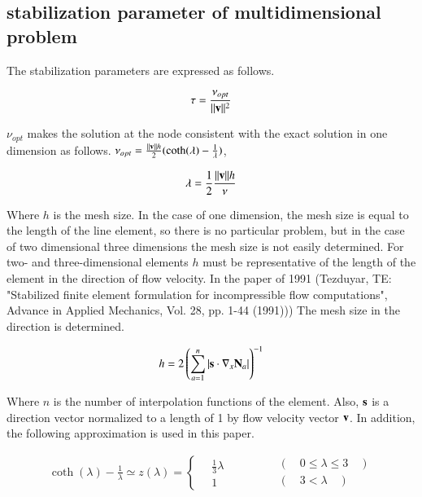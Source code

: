 \subsection{stabilization parameter of multidimensional problem}
The stabilization parameters are expressed as follows.

\begin{equation}
\tau = \frac{\nu_{opt}}{||\mathbf{v}||^2}
\end{equation}

$\nu_{opt}$ makes the solution at the node consistent with the exact solution in one dimension as follows.
$\nu_{opt} = \frac{||\mathbf{v}||h}{2}(\coth(\lambda)-\frac{1}{\lambda})$,

\begin{equation}
\lambda=\frac{1}{2}\frac{||\mathbf{v}||h}{\nu}
\end{equation}

Where $h$ is the mesh size. In the case of one dimension, the mesh size is equal to the length of the line element, so there is no particular problem, but in the case of two dimensional three dimensions the mesh size is not easily determined. For two- and three-dimensional elements $h$ must be representative of the length of the element in the direction of flow velocity.
In the paper of 1991 (Tezduyar, TE: "Stabilized finite element formulation for incompressible flow computations", Advance in Applied Mechanics, Vol. 28, pp. 1-44 (1991))) The mesh size in the direction is determined.

\begin{equation}
h = 2 \left( \sum_{a=1}^{n} \left|\mathbf{s} \cdot \nabla_x \mathbf{N}_a \right|\right)^{-1}
\end{equation}

Where $n$ is the number of interpolation functions of the element. Also, $\mathbf{s}$ is a direction vector normalized to a length of 1 by flow velocity vector $\mathbf{v}$.
In addition, the following approximation is used in this paper.

\begin{eqnarray}
\coth(\lambda)-\frac{1}{\lambda}\simeq z(\lambda)
=\left\{\quad\begin{array}{l}
\frac{1}{3}\lambda\\
1
\end{array}
\qquad\qquad
\begin{array}{l}
(\quad 0\le\lambda\le3 \quad )\\
(\quad 3 < \lambda \quad )
\end{array}\right.
\end{eqnarray}

